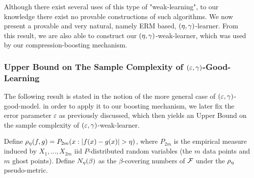 \documentclass[12pt,a4paper,oneside,onecolumn]{book}
\begin{document}
Although there exist several uses of this type of "weak-learning",
to our knowledge there exist no provable constructions of such algorithms.
We now present a provable and very natural, namely ERM based, $(\eta,\gamma)$-learner.
From this result, we are also able to construct our $(\eta,\gamma)$-weak-learner,
which was used by our compression-boosting mechanism.

    



\subsubsection{Upper Bound on The Sample Complexity of $(\varepsilon,\gamma)$-Good-Learning}

The following result is stated in the notion of the more general case of
$(\varepsilon,\gamma)$-good-model.
in order to apply it to our boosting mechanism,
we later fix the error parameter $\varepsilon$ as
previously discussed,
which then yields an Upper Bound
on the sample complexity of $(\varepsilon,\gamma)$-weak-learner.

Define $\rho_{\eta}(f,g) = P_{2m}( x : |f(x) - g(x)| > \eta )$, where $P_{2m}$ is the empirical measure induced by $X_{1},\ldots,X_{2m}$ iid $P$-distributed random variables
(the $m$ data points and $m$ ghost points).
Define $N_{\eta}(\beta)$ as the $\beta$-covering numbers of $\mathcal{F}$
under the $\rho_{\eta}$ pseudo-metric.
\end{document}
